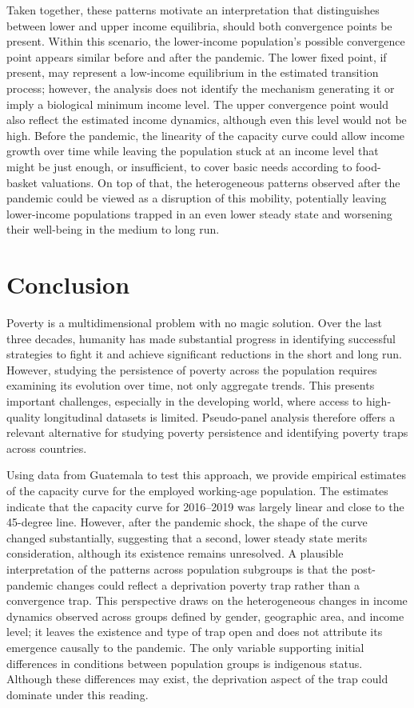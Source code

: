 \documentclass{article}
\begin{document}
Taken together, these patterns motivate an interpretation that distinguishes between lower and upper income equilibria, should both convergence points be present. Within this scenario, the lower-income population's possible convergence point appears similar before and after the pandemic. The lower fixed point, if present, may represent a low-income equilibrium in the estimated transition process; however, the analysis does not identify the mechanism generating it or imply a biological minimum income level. The upper convergence point would also reflect the estimated income dynamics, although even this level would not be high. Before the pandemic, the linearity of the capacity curve could allow income growth over time while leaving the population stuck at an income level that might be just enough, or insufficient, to cover basic needs according to food-basket valuations. On top of that, the heterogeneous patterns observed after the pandemic could be viewed as a disruption of this mobility, potentially leaving lower-income populations trapped in an even lower steady state and worsening their well-being in the medium to long run. 
\clearpage
\label{sec:results}

\clearpage

\section{Conclusion}
Poverty is a multidimensional problem with no magic solution. Over the last three decades, humanity has made substantial progress in identifying successful strategies to fight it and achieve significant reductions in the short and long run. However, studying the persistence of poverty across the population requires examining its evolution over time, not only aggregate trends. This presents important challenges, especially in the developing world, where access to high-quality longitudinal datasets is limited. Pseudo-panel analysis therefore offers a relevant alternative for studying poverty persistence and identifying poverty traps across countries.

Using data from Guatemala to test this approach, we provide empirical estimates of the capacity curve for the employed working-age population. The estimates indicate that the capacity curve for 2016--2019 was largely linear and close to the 45-degree line. However, after the pandemic shock, the shape of the curve changed substantially, suggesting that a second, lower steady state merits consideration, although its existence remains unresolved. A plausible interpretation of the patterns across population subgroups is that the post-pandemic changes could reflect a deprivation poverty trap rather than a convergence trap. This perspective draws on the heterogeneous changes in income dynamics observed across groups defined by gender, geographic area, and income level; it leaves the existence and type of trap open and does not attribute its emergence causally to the pandemic. The only variable supporting initial differences in conditions between population groups is indigenous status. Although these differences may exist, the deprivation aspect of the trap could dominate under this reading.
\end{document}
